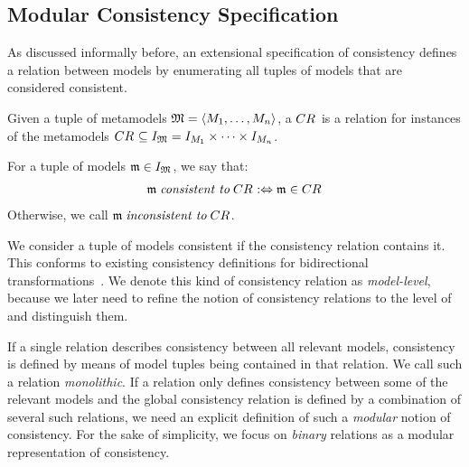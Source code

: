\subsection{Modular Consistency Specification}

As discussed informally before, an extensional specification of consistency defines a relation between models by enumerating all tuples of models that are considered consistent.

\begin{definition}[\ModelLevelConsistencyRelation]
    \label{def:modellevelconsistencyrelation}
    Given a tuple of metamodels $\metamodeltuple{M} = \tupled{\metamodelsequence{M}{n}}$, a \emph{\modellevelconsistencyrelation} $\consistencyrelation{CR}{}$ is a relation for instances of the metamodels $\consistencyrelation{CR}{} \subseteq \metamodeltupleinstanceset{M} = \metamodelinstanceset{M}{1} \times \dots \times \metamodelinstanceset{M}{n}$.

    For a tuple of models $\modeltuple{m} \in \metamodeltupleinstanceset{M}$, we say that:
    \begin{align*}
        \modeltuple{m} \consistenttomath \consistencyrelation{CR}{} \equivalentperdefinition \modeltuple{m} \in \consistencyrelation{CR}{}
    \end{align*}
    Otherwise, we call $\modeltuple{m} \inconsistenttomath \consistencyrelation{CR}{}$.
\end{definition}

We consider a tuple of models consistent if the consistency relation contains it.
This conforms to existing consistency definitions for bidirectional transformations~\cite{stevens2010sosym}.
We denote this kind of consistency relation as \emph{model-level}, because we later need to refine the notion of consistency relations to the level of \metaclasses and distinguish them.

If a single relation describes consistency between all relevant models, consistency is defined by means of model tuples being contained in that relation. We call such a relation \emph{monolithic}.
If a relation only defines consistency between some of the relevant models and the global consistency relation is defined by a combination of several such relations, we need an explicit definition of such a \emph{modular} notion of consistency.
For the sake of simplicity, we focus on \emph{binary} relations as a modular representation of consistency.

